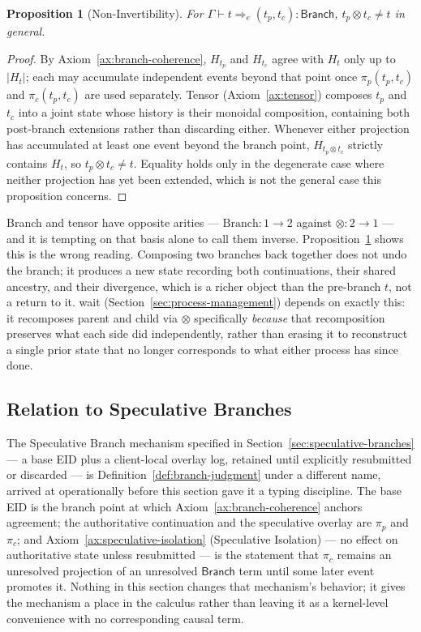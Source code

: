 \documentclass[11pt]{article}
\newtheorem{proposition}{Proposition}[section]
\begin{document}
\begin{proposition}[Non-Invertibility]
\label{prop:branch-tensor-noninverse}
For $\Gamma \vdash t \Longrightarrow_e (t_p,t_c) : \mathsf{Branch}$, $t_p \otimes t_c \neq t$ in general.
\end{proposition}
\begin{proof}
By Axiom~\ref{ax:branch-coherence}, $H_{t_p}$ and $H_{t_c}$ agree with $H_t$ only up to $|H_t|$; each may accumulate independent events beyond that point once $\pi_p(t_p,t_c)$ and $\pi_c(t_p,t_c)$ are used separately. Tensor (Axiom~\ref{ax:tensor}) composes $t_p$ and $t_c$ into a joint state whose history is their monoidal composition, containing both post-branch extensions rather than discarding either. Whenever either projection has accumulated at least one event beyond the branch point, $H_{t_p \otimes t_c}$ strictly contains $H_t$, so $t_p \otimes t_c \neq t$. Equality holds only in the degenerate case where neither projection has yet been extended, which is not the general case this proposition concerns.
\end{proof}

Branch and tensor have opposite arities --- $\mathrm{Branch}: 1 \to 2$ against $\otimes : 2 \to 1$ --- and it is tempting on that basis alone to call them inverse. Proposition~\ref{prop:branch-tensor-noninverse} shows this is the wrong reading. Composing two branches back together does not undo the branch; it produces a new state recording both continuations, their shared ancestry, and their divergence, which is a richer object than the pre-branch $t$, not a return to it. wait (Section~\ref{sec:process-management}) depends on exactly this: it recomposes parent and child via $\otimes$ specifically \emph{because} that recomposition preserves what each side did independently, rather than erasing it to reconstruct a single prior state that no longer corresponds to what either process has since done.

\subsection{Relation to Speculative Branches}

The Speculative Branch mechanism specified in Section~\ref{sec:speculative-branches} --- a base EID plus a client-local overlay log, retained until explicitly resubmitted or discarded --- is Definition~\ref{def:branch-judgment} under a different name, arrived at operationally before this section gave it a typing discipline. The base EID is the branch point at which Axiom~\ref{ax:branch-coherence} anchors agreement; the authoritative continuation and the speculative overlay are $\pi_p$ and $\pi_c$; and Axiom~\ref{ax:speculative-isolation} (Speculative Isolation) --- no effect on authoritative state unless resubmitted --- is the statement that $\pi_c$ remains an unresolved projection of an unresolved $\mathsf{Branch}$ term until some later event promotes it. Nothing in this section changes that mechanism's behavior; it gives the mechanism a place in the calculus rather than leaving it as a kernel-level convenience with no corresponding causal term.
\end{document}
